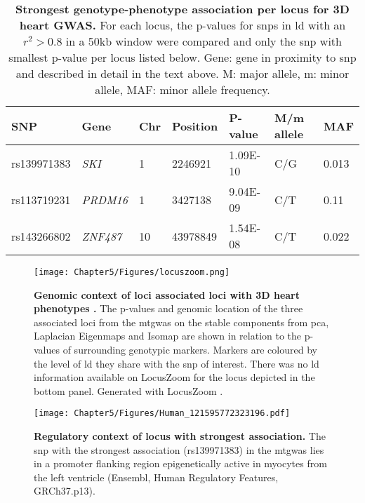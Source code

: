 \begin{table}[htbp]
  \centering
  \caption[\textbf{Strongest genotype-phenotype association per locus for 3D heart GWAS. }]{\textbf{Strongest genotype-phenotype association per locus for 3D heart GWAS. } For each locus, the p-values for \glspl{snp} in \gls{ld} with an \(r^2 > 0.8\) in a \num{50}kb window were compared and only the \gls{snp}  with smallest p-value per locus listed below. Gene: gene in proximity to \gls{snp}  and described in detail in the text above. M: major allele, m:  minor allele, MAF: minor allele frequency. }
  \begin{small}
    \begin{tabular}{lllllll}
    \toprule
    SNP   & Gene & Chr   & Position & P-value &  M/m allele & MAF \\
    \midrule
    rs139971383 & \textit{SKI} & \num{1} & \num{2246921} & \num{1.09E-10} & C/G     & \num{0.013} \\
    rs113719231 & \textit{PRDM16} & \num{1} & \num{3427138} & \num{9.04E-09} & C/T     & \num{0.11} \\
    rs143266802 & \textit{ZNF487} & \num{10} & \num{43978849} & \num{1.54E-08} & C/T     & \num{0.022} \\
    \bottomrule
    \end{tabular}%
    \end{small}
  \label{tab:gwas-heart}%
\end{table}%
%
\begin{figure}[hbtp]
	\centering
	\texttt{[image: Chapter5/Figures/locuszoom.png]}
	\caption[\textbf{Genomic context of loci associated loci with 3D heart phenotypes. }]{\textbf{Genomic context of loci associated loci with 3D heart phenotypes . }The p-values and genomic location of the three associated loci from the \gls{mtgwas} on the stable components from \gls{pca}, Laplacian Eigenmaps and Isomap are shown in relation to the p-values of surrounding genotypic markers. Markers are coloured by the level of \gls{ld} they share with the \gls{snp}  of interest. There was no \gls{ld} information available on LocusZoom for the locus depicted in the bottom panel. Generated with LocusZoom \citep{Pruim2010}.}  
	 	\label{fig:locuszoom-heart}
\end{figure}
%
\begin{figure}[hbtp]
	\centering
	\texttt{[image: Chapter5/Figures/Human\_121595772323196.pdf]}
	\caption[\textbf{Regulatory context of locus with strongest association. }]{\textbf{Regulatory context of locus with strongest association. } The \gls{snp} with the strongest association (rs139971383) in the \gls{mtgwas} lies in a promoter flanking region epigenetically active in myocytes from the left ventricle (Ensembl, Human Regulatory Features, GRCh37.p13). } 
	 	\label{fig:regulatory-heart}
\end{figure}
